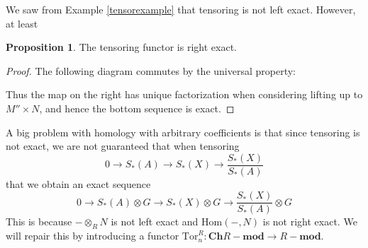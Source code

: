 \documentclass[12pt,reqno]{amsart}
\numberwithin{theorem}{section}
\theoremstyle{definition}
\theoremstyle{remark}
\numberwithin{equation}{section}
\theoremstyle{definition}
\newtheorem{prop}[theorem]{Proposition}
\newcommand{\id}{\mathrm{id}}
\renewcommand{\hom}{\mathrm{Hom}}
\newcommand{\Tor}{\mathrm{Tor}}
\begin{document}
We saw from Example \ref{tensorexample} that tensoring is not left exact. However, at least
\begin{prop}
    The tensoring functor is right exact.
\end{prop}
\begin{proof}
    The following diagram commutes by the universal property:
    \begin{center}
    \end{center}
    Thus the map on the right has unique factorization when considering lifting up to $M''\times N$, and hence the bottom sequence is exact.
\end{proof}
A big problem with homology with arbitrary coefficients is that since tensoring is not exact, we are not guaranteed that when tensoring
$$0 \rightarrow S_*(A) \rightarrow S_*(X) \rightarrow \frac{S_*(X)}{S_*(A)}$$
that we obtain an exact sequence
$$0 \rightarrow S_*(A) \otimes G\rightarrow S_*(X)\otimes G \rightarrow \frac{S_*(X)}{S_*(A)} \otimes G$$
This is because $-\otimes_R N$ is not left exact and $\hom(-,N)$ is not right exact. We will repair this by introducing a functor $\Tor_n^R: \mathbf{Ch}R-\mathbf{mod} \rightarrow R-\mathbf{mod}$. 
\end{document}
